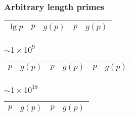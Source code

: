\subsubsection{Arbitrary length primes}
\begin{table}[h]
  \centering
  \begin{tabular}{|c|c|c|c|c|}
  \hline
  $\lg p$ & $p$ & $g(p)$ & $p$ & $g(p)$ \\ \hline
   \hline
  \end{tabular}
\end{table}
\newpage

\subsubsection{$\sim 1 \times 10^9$}
\begin{table}[h]
  \centering
  \begin{tabular}{|c|c|c|c|c|c|}
  \hline
  $p$ & $g(p)$ & $p$ & $g(p)$ & $p$ & $g(p)$ \\ \hline
   \hline
  \end{tabular}
\end{table}

\subsubsection{$\sim 1 \times 10^{18}$}
\begin{table}[h]
  \centering
  \begin{tabular}{|c|c|c|c|}
  \hline
  $p$ & $g(p)$ & $p$ & $g(p)$ \\ \hline
   \hline
  \end{tabular}
\end{table}


